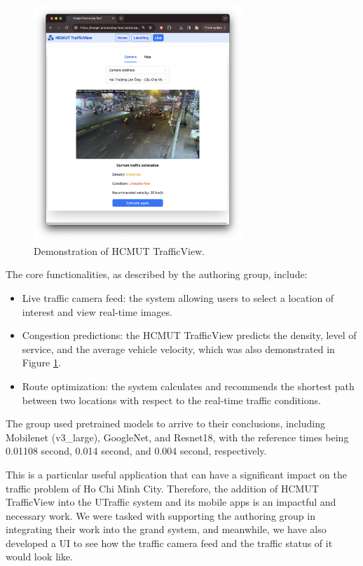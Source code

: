 \begin{figure}[H]
    \centering
    \includegraphics[width=0.7\textwidth]{assets/images/Research/trafficview/hcmut_trafficview_demo.png}
    \caption{Demonstration of HCMUT TrafficView.}
    \label{fig:trafficview_demo}
\end{figure}

The core functionalities, as described by the authoring group, include:
\begin{itemize}
    \item Live traffic camera feed: the system allowing users to select a location of interest and view real-time images.
    \item Congestion predictions: the HCMUT TrafficView predicts the density, level of service, and the average vehicle velocity, which was also demonstrated in Figure \ref{fig:trafficview_demo}.
    \item Route optimization: the system calculates and recommends the shortest path between two locations with respect to the real-time traffic conditions.
\end{itemize}

The group used pretrained models to arrive to their conclusions, including Mobilenet (v3\_large), GoogleNet, and Resnet18, with the reference times being 0.01108 second, 0.014 second, and 0.004 second, respectively.

This is a particular useful application that can have a significant impact on the traffic problem of Ho Chi Minh City. Therefore, the addition of HCMUT TrafficView into the UTraffic system and its mobile apps is an impactful and necessary work. We were tasked with supporting the authoring group in integrating their work into the grand system, and meanwhile, we have also developed a UI to see how the traffic camera feed and the traffic status of it would look like. 